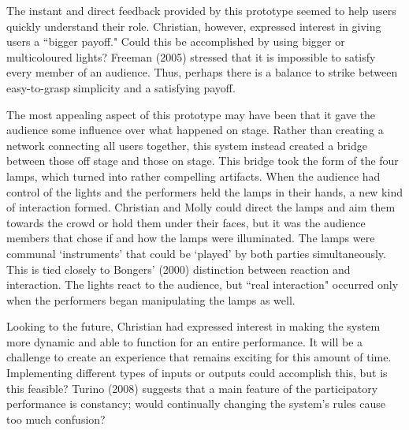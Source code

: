The instant and direct feedback provided by this prototype seemed to help users quickly understand their role. Christian, however, expressed interest in giving users a ``bigger payoff." Could this be accomplished by using bigger or multicoloured lights? Freeman (2005) stressed that it is impossible to satisfy every member of an audience. Thus, perhaps there is a balance to strike between easy-to-grasp simplicity and a satisfying payoff.

The most appealing aspect of this prototype may have been that it gave the audience some influence over what happened on stage. Rather than creating a network connecting all users together, this system instead created a bridge between those off stage and those on stage. This bridge took the form of the four lamps, which turned into rather compelling artifacts. When the audience had control of the lights and the performers held the lamps in their hands, a new kind of interaction formed. Christian and Molly could direct the lamps and aim them towards the crowd or hold them under their faces, but it was the audience members that chose if and how the lamps were illuminated. The lamps were communal `instruments' that could be `played' by both parties simultaneously. This is tied closely to Bongers' (2000) distinction between reaction and interaction. The lights react to the audience, but ``real interaction" occurred only when the performers began manipulating the lamps as well.

Looking to the future, Christian had expressed interest in making the system more dynamic and able to function for an entire performance. It will be a challenge to create an experience that remains exciting for this amount of time. Implementing different types of inputs or outputs could accomplish this, but is this feasible? Turino (2008) suggests that a main feature of the participatory performance is constancy; would continually changing the system's rules cause too much confusion?


